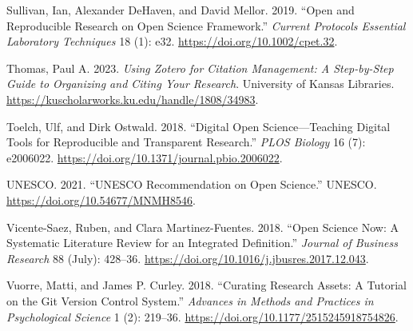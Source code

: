 \documentclass[
  a4paper,
]{article}
\newlength{\cslhangindent}
\newenvironment{CSLReferences}[2] %
 {\begin{list}{}{%
  \setlength{\itemindent}{0pt}
  \setlength{\leftmargin}{0pt}
  \setlength{\parsep}{0pt}
  \ifodd #1
   \setlength{\leftmargin}{\cslhangindent}
   \setlength{\itemindent}{-1\cslhangindent}
  \fi
  \setlength{\itemsep}{#2\baselineskip}}}
 {\end{list}}
\begin{document}
\begin{CSLReferences}{1}{0}
Sullivan, Ian, Alexander DeHaven, and David Mellor. 2019. {``Open and
Reproducible Research on Open Science Framework.''} \emph{Current
Protocols Essential Laboratory Techniques} 18 (1): e32.
\url{https://doi.org/10.1002/cpet.32}.

Thomas, Paul A. 2023. \emph{Using Zotero for Citation Management: A
Step-by-Step Guide to Organizing and Citing Your Research}. University
of Kansas Libraries.
\url{https://kuscholarworks.ku.edu/handle/1808/34983}.

Toelch, Ulf, and Dirk Ostwald. 2018. {``Digital Open
Science---{Teaching} Digital Tools for Reproducible and Transparent
Research.''} \emph{PLOS Biology} 16 (7): e2006022.
\url{https://doi.org/10.1371/journal.pbio.2006022}.

UNESCO. 2021. {``{UNESCO Recommendation} on {Open Science}.''} UNESCO.
\url{https://doi.org/10.54677/MNMH8546}.

Vicente-Saez, Ruben, and Clara Martinez-Fuentes. 2018. {``Open {Science}
Now: {A} Systematic Literature Review for an Integrated Definition.''}
\emph{Journal of Business Research} 88 (July): 428--36.
\url{https://doi.org/10.1016/j.jbusres.2017.12.043}.

Vuorre, Matti, and James P. Curley. 2018. {``Curating {Research Assets}:
{A Tutorial} on the {Git Version Control System}.''} \emph{Advances in
Methods and Practices in Psychological Science} 1 (2): 219--36.
\url{https://doi.org/10.1177/2515245918754826}.

\end{CSLReferences}
\end{document}
